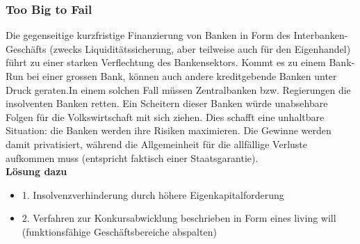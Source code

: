 \subsubsection{Too Big to Fail}
Die gegenseitige kurzfristige Finanzierung von Banken in Form des Interbanken-Geschäfts (zwecks Liquiditätssicherung, aber teilweise auch für den Eigenhandel) führt zu einer starken Verflechtung des Bankensektors. Kommt es zu einem Bank-Run bei einer grossen Bank, können auch andere kreditgebende Banken unter Druck geraten.In einem solchen Fall müssen Zentralbanken bzw. Regierungen die insolventen Banken retten. Ein Scheitern dieser Banken würde unabsehbare Folgen für die Volkswirtschaft mit sich ziehen. Dies schafft eine unhaltbare Situation: die Banken werden ihre Risiken maximieren. Die Gewinne werden damit privatisiert, während die Allgemeinheit für die allfällige Verluste aufkommen muss (entspricht faktisch einer Staatsgarantie).\\
\textbf{Lösung dazu}\\
\begin{itemize}
	\item 1. Insolvenzverhinderung durch höhere Eigenkapitalforderung
	\item 2. Verfahren zur Konkursabwicklung beschrieben in Form eines living will (funktionsfähige Geschäftsbereiche abspalten)
\end{itemize}

